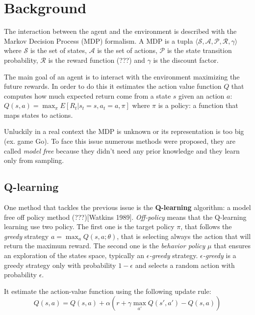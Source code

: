 \section{Background}


The interaction between the agent and the environment is described  with the
Markov Decision Process (MDP) formalism. A MDP is a tupla $\langle \mathcal{S}, 
\mathcal{A}, \mathcal{P}, \mathcal{R}, \gamma \rangle$ where $\mathcal{S}$ is
the set of states, $\mathcal{A}$ is the set of actions, $\mathcal{P}$ is the 
state transition probability, $\mathcal{R}$ is the reward function (???) and 
$\gamma$ is the discount factor.

The main goal of an agent is to interact with the environment maximizing the future rewards. In order to do this it estimates the action value function $Q$ that computes how much expected return come from a state $s$ given an action $a$: $Q(s, a) = \max_\pi E[R_t | s_t = s, a_t = a, \pi]$ where $\pi$ is a policy: a function that maps states to actions.


Unluckily in a real context the MDP is unknown or its representation is too big
(ex. game Go). To face this issue numerous methods were proposed, they are 
called \textit{model free} because they didn't need any prior knowledge and they learn only from sampling.


\subsection{Q-learning}

One method that tackles the previous issue is the \textbf{Q-learning} algorithm: a model free off policy method (???)[Watkins 1989]. 
\textit{Off-policy} means that the Q-learning learning use two policy. The first one is the target policy $\pi$, that follows the \textit{greedy} strategy $a = \max_a Q(s, a; \theta)$, that is selecting always the action that will return the maximum reward.
The second one is the \textit{behavior policy} $\mu$ that ensures an exploration of the states space, typically an \textit{$\epsilon$-greedy} strategy. \textit{$\epsilon$-greedy} is a greedy strategy only with probability $1 - \epsilon$ and selects a random action with probability $\epsilon$.

It estimate the action-value function using the following update rule:
\begin{equation}
	Q(s,a) = Q(s, a) + \alpha (r + \gamma \max_{a'} Q(s', a') - Q(s, a))
\end{equation}

